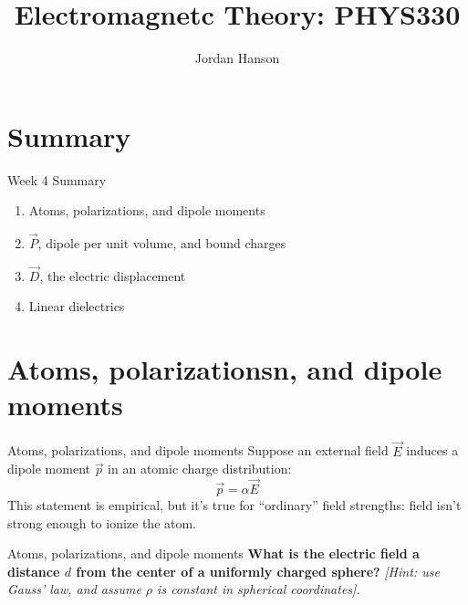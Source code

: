 \documentclass{beamer}
\title{Electromagnetc Theory: PHYS330}
\author{Jordan Hanson}
\institute{Whittier College Department of Physics and Astronomy}
\begin{document}
\maketitle

\section{Summary}

\begin{frame}{Week 4 Summary}
\begin{enumerate}
\item Atoms, polarizations, and dipole moments
\item $\vec{P}$, dipole per unit volume, and bound charges
\item $\vec{D}$, the electric displacement
\item Linear dielectrics
\end{enumerate}
\end{frame}

\section{Atoms, polarizationsn, and dipole moments}

\begin{frame}{Atoms, polarizations, and dipole moments}
Suppose an external field $\vec{E}$ induces a dipole moment $\vec{p}$ in an atomic charge distribution:
\begin{equation}
\boxed{
\vec{p} = \alpha \vec{E}
}
\end{equation}
This statement is empirical, but it's true for ``ordinary'' field strengths: field isn't strong enough to ionize the atom.
\end{frame}

\begin{frame}{Atoms, polarizations, and dipole moments}
\textbf{What is the electric field a distance $d$ from the center of a uniformly charged sphere?} \textit{[Hint: use Gauss' law, and assume $\rho$ is constant in spherical coordinates].} \\ \vspace{6cm}
\end{frame}
\end{document}
